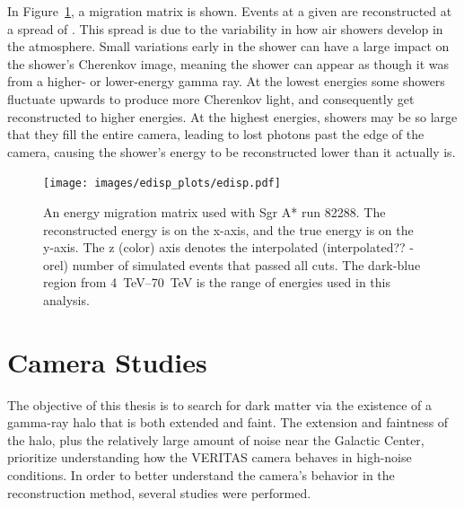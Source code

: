     In Figure~\ref{fig:migmatrix}, a migration matrix is shown.
    Events at a given \ETrue{} are reconstructed at a spread of \EReco{}.
    This spread is due to the variability in how air showers develop in the atmosphere.
    Small variations early in the shower can have a large impact on the shower's Cherenkov image, meaning the shower can appear as though it was from a higher- or lower-energy gamma ray.
    At the lowest \ETrue{} energies some showers fluctuate upwards to produce more Cherenkov light, and consequently get reconstructed to higher \EReco{} energies.
    At the highest \ETrue{} energies, showers may be so large that they fill the entire camera, leading to lost photons past the edge of the camera, causing the shower's energy to be reconstructed lower than it actually is.

    \begin{figure}[!th]
      \centering
      \texttt{[image: images/edisp\_plots/edisp.pdf]}
      \caption[Energy Migration Matrix]{
        An energy migration matrix used with Sgr A* run 82288.
        The reconstructed energy is on the x-axis, and the true energy is on the y-axis.
        The z (color) axis denotes the interpolated {\color{red}(interpolated?? -orel)} number of simulated events that passed all cuts.
        The dark-blue region from \SIrange{4}{70}{TeV} \EReco{} is the range of energies used in this analysis.
      }
      \label{fig:migmatrix}
    \end{figure}
  
  \FloatBarrier

\section{Camera Studies}
The objective of this thesis is to search for dark matter via the existence of a gamma-ray halo that is both extended and faint.
The extension and faintness of the halo, plus the relatively large amount of noise near the Galactic Center, prioritize understanding how the VERITAS camera behaves in high-noise conditions.
In order to better understand the camera's behavior in the reconstruction method, several studies were performed.

